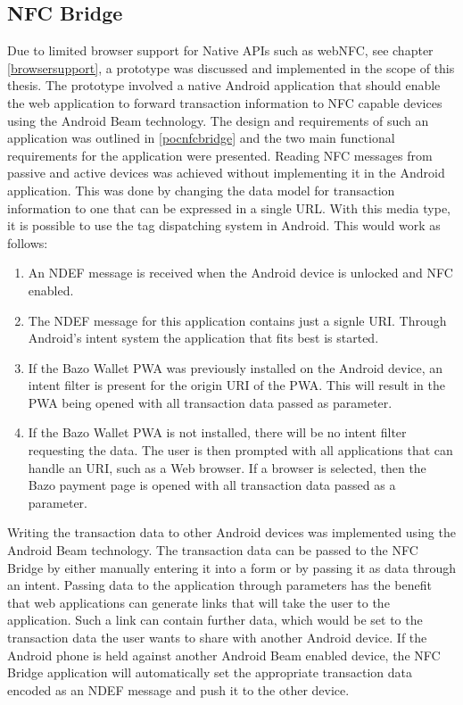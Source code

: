 \subsection{NFC Bridge}\label{nfcbridge}
Due to limited browser support for Native APIs such as webNFC, see chapter \ref{browsersupport}, a prototype was discussed and implemented in the scope of this thesis. The prototype involved a native Android application that should enable the web application to forward transaction information to NFC capable devices using the Android Beam technology.
The design and requirements of such an application was outlined in \ref{pocnfcbridge} and the two main functional requirements for the application were presented.
Reading NFC messages from passive and active devices was achieved without implementing it in the Android application. This was done by changing the data model for transaction information to one that can be expressed in a single URL. With this media type, it is possible to use the tag dispatching system in Android. This would work as follows:
\begin{enumerate}
\item An NDEF message is received when the Android device is unlocked and NFC enabled.
\item The NDEF message for this application contains just a signle URI. Through Android's intent system the application that fits best is started.
\item If the Bazo Wallet PWA was previously installed on the Android device, an intent filter is present for the origin URI of the PWA. This will result in the PWA being opened with all transaction data passed as parameter.
\item If the Bazo Wallet PWA is not installed, there will be no intent filter requesting the data. The user is then prompted with all applications that can handle an URI, such as a Web browser. If a browser is selected, then the Bazo payment page is opened with all transaction data passed as a parameter.
\end{enumerate}

Writing the transaction data to other Android devices was implemented using the Android Beam technology.
The transaction data can be passed to the NFC Bridge by either manually entering it into a form or by passing it as data through an intent. Passing data to the application through parameters has the benefit that web applications can generate links that will take the user to the application. Such a link can contain further data, which would be set to the transaction data the user wants to share with another Android device.
If the Android phone is held against another Android Beam enabled device, the NFC Bridge application will automatically set the appropriate transaction data encoded as an NDEF message and push it to the other device.

